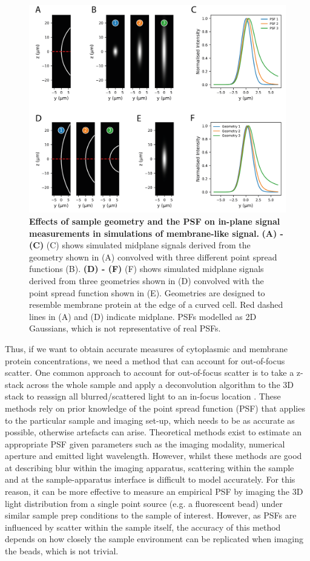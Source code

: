 \documentclass[12pt]{"report"}
\newcommand{\mycaption}[2]{\caption[#1]{\textbf{#1.} #2}}
\begin{document}
\begin{figure}
\includegraphics[scale=0.9]{memquant_mem_psf}
\centering
\mycaption{Effects of sample geometry and the PSF on in-plane signal measurements in simulations of membrane-like signal}{
\textbf{(A) - (C)} (C) shows simulated midplane signals derived from the geometry shown in (A) convolved with three different point spread functions (B).
\textbf{(D) - (F)} (F) shows simulated midplane signals derived from three geometries shown in (D) convolved with the point spread function shown in (E). Geometries are designed to resemble membrane protein at the edge of a curved cell. Red dashed lines in (A) and (D) indicate midplane. PSFs modelled as 2D Gaussians, which is not representative of real PSFs.
}
\label{fig:memquant_mem_psf}
\end{figure}

Thus, if we want to obtain accurate measures of cytoplasmic and membrane protein concentrations, we need a method that can account for out-of-focus scatter. One common approach to account for out-of-focus scatter is to take a z-stack across the whole sample and apply a deconvolution algorithm to the 3D stack to reassign all blurred/scattered light to an in-focus location \citep{Wallace2001}. These methods rely on prior knowledge of the point spread function (PSF) that applies to the particular sample and imaging set-up, which needs to be as accurate as possible, otherwise artefacts can arise. Theoretical methods exist to estimate an appropriate PSF given parameters such as the imaging modality, numerical aperture and emitted light wavelength. However, whilst these methods are good at describing blur within the imaging apparatus, scattering within the sample and at the sample-apparatus interface is difficult to model accurately. For this reason, it can be more effective to measure an empirical PSF by imaging the 3D light distribution from a single point source (e.g. a fluorescent bead) under similar sample prep conditions to the sample of interest. However, as PSFs are influenced by scatter within the sample itself, the accuracy of this method depends on how closely the sample environment can be replicated when imaging the beads, which is not trivial. \\
\end{document}
